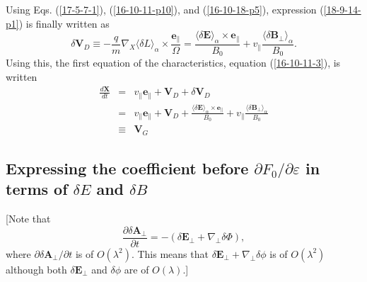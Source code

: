 \documentclass{article}
\newcommand{\tmem}[1]{{\em #1\/}}
\begin{document}
Using Eqs. (\ref{17-5-7-1}), (\ref{16-10-11-p10}), and (\ref{16-10-18-p5}),
expression (\ref{18-9-14-p1}) is finally written as
\begin{equation}
  \delta \mathbf{V}_D \equiv - \frac{q}{m} \nabla_X \langle \delta L
  \rangle_{\alpha} \times \frac{\mathbf{e}_{\parallel}}{\Omega} =
  \frac{\langle \delta \mathbf{E} \rangle_{\alpha} \times
  \mathbf{e}_{\parallel}}{B_0} + v_{\parallel} \frac{\langle \delta
  \mathbf{B}_{\perp} \rangle_{\alpha}}{B_0} .
\end{equation}
Using this, the first equation of the characteristics, equation
(\ref{16-10-11-3}), is written
\begin{eqnarray}
  \frac{d\mathbf{X}}{d t} & = & v_{\parallel} \mathbf{e}_{\parallel}
  +\mathbf{V}_D + \delta \mathbf{V}_D  \label{16-10-11-p20}\\
  & = & v_{\parallel} \mathbf{e}_{\parallel} +\mathbf{V}_D + \frac{\langle
  \delta \mathbf{E} \rangle_{\alpha} \times \mathbf{e}_{\parallel}}{B_0} +
  v_{\parallel} \frac{\langle \delta \mathbf{B}_{\perp} \rangle_{\alpha}}{B_0}
  \nonumber\\
  & \equiv & \mathbf{V}_G 
\end{eqnarray}

\subsection{Expressing {\tmem{}}the coefficient before $\partial F_0 /
\partial \varepsilon$ in terms of $\delta E$ and $\delta B$}

[Note that
\begin{equation}
  \frac{\partial \delta \mathbf{A}_{\perp}}{\partial t} = - (\delta
  \mathbf{E}_{\perp} + \nabla_{\perp} \delta \Phi),
\end{equation}
where $\partial \delta \mathbf{A}_{\perp} / \partial t$ is of $O (\lambda^2)$.
This means that $\delta \mathbf{E}_{\perp} + \nabla_{\perp} \delta \phi$ is of
$O (\lambda^2)$ although both $\delta \mathbf{E}_{\perp}$ and $\delta \phi$
are of $O (\lambda)$.]
\end{document}
